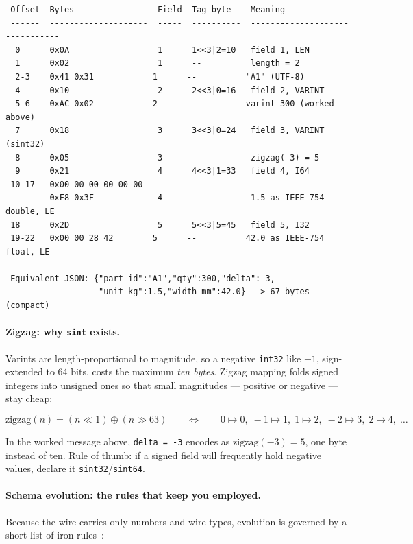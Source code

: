 \begin{verbatim}
 Offset  Bytes                 Field  Tag byte    Meaning
 ------  --------------------  -----  ----------  -------------------------------
  0      0x0A                  1      1<<3|2=10   field 1, LEN
  1      0x02                  1      --          length = 2
  2-3    0x41 0x31            1      --          "A1" (UTF-8)
  4      0x10                  2      2<<3|0=16   field 2, VARINT
  5-6    0xAC 0x02            2      --          varint 300 (worked above)
  7      0x18                  3      3<<3|0=24   field 3, VARINT (sint32)
  8      0x05                  3      --          zigzag(-3) = 5
  9      0x21                  4      4<<3|1=33   field 4, I64
 10-17   0x00 00 00 00 00 00
         0xF8 0x3F             4      --          1.5 as IEEE-754 double, LE
 18      0x2D                  5      5<<3|5=45   field 5, I32
 19-22   0x00 00 28 42        5      --          42.0 as IEEE-754 float, LE

 Equivalent JSON: {"part_id":"A1","qty":300,"delta":-3,
                   "unit_kg":1.5,"width_mm":42.0}  -> 67 bytes (compact)
\end{verbatim}

\paragraph{Zigzag: why \texttt{sint} exists.}
Varints are length-proportional to magnitude, so a negative \texttt{int32} like
$-1$, sign-extended to 64 bits, costs the maximum \emph{ten bytes}. Zigzag mapping
folds signed integers into unsigned ones so that small magnitudes --- positive or
negative --- stay cheap:

\[
\text{zigzag}(n) = (n \ll 1) \mathbin{\oplus} (n \gg 63)
\qquad\Longleftrightarrow\qquad
0\mapsto0,\; -1\mapsto1,\; 1\mapsto2,\; -2\mapsto3,\; 2\mapsto4,\; \dots
\]

In the worked message above, \texttt{delta = -3} encodes as
$\text{zigzag}(-3) = 5$, one byte instead of ten. Rule of thumb: if a signed field
will frequently hold negative values, declare it \texttt{sint32}/\texttt{sint64}.

\paragraph{Schema evolution: the rules that keep you employed.}
Because the wire carries only numbers and wire types, evolution is governed by a
short list of iron rules~\cite{protobufdocs, kleppmann2017ddia}:

